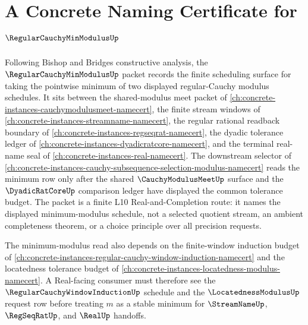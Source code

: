 \chapter{A Concrete Naming Certificate for $\RegularCauchyMinModulusUp$}
\label{ch:concrete-instances-regular-cauchy-min-modulus-namecert}

Following Bishop and Bridges constructive analysis, the $\RegularCauchyMinModulusUp$ packet records the finite scheduling surface for taking the pointwise minimum of two displayed regular-Cauchy modulus schedules. It sits between the shared-modulus meet packet of \autoref{ch:concrete-instances-cauchymodulusmeet-namecert}, the finite stream windows of \autoref{ch:concrete-instances-streamname-namecert}, the regular rational readback boundary of \autoref{ch:concrete-instances-regseqrat-namecert}, the dyadic tolerance ledger of \autoref{ch:concrete-instances-dyadicratcore-namecert}, and the terminal real-name seal of \autoref{ch:concrete-instances-real-namecert}. The downstream selector of \autoref{ch:concrete-instances-cauchy-subsequence-selection-modulus-namecert} reads the minimum row only after the shared $\CauchyModulusMeetUp$ surface and the $\DyadicRatCoreUp$ comparison ledger have displayed the common tolerance budget. The packet is a finite L10 Real-and-Completion route: it names the displayed minimum-modulus schedule, not a selected quotient stream, an ambient completeness theorem, or a choice principle over all precision requests.

The minimum-modulus read also depends on the finite-window induction budget of \autoref{ch:concrete-instances-regular-cauchy-window-induction-namecert} and the locatedness tolerance budget of \autoref{ch:concrete-instances-locatedness-modulus-namecert}. A Real-facing consumer must therefore see the $\RegularCauchyWindowInductionUp$ schedule and the $\LocatednessModulusUp$ request row before treating $m$ as a stable minimum for $\StreamNameUp$, $\RegSeqRatUp$, and $\RealUp$ handoffs.

